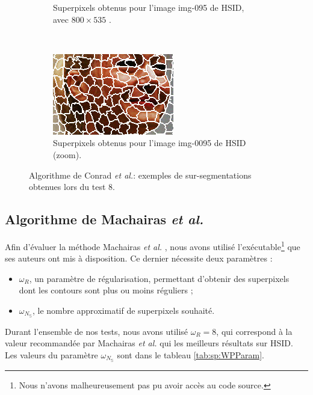 \begin{figure}[htb]
\begin{subfigure}[t]{0.45\textwidth}
		 	\caption{Superpixels obtenus pour l'image img-095 de HSID, avec $ 800 \times 535$ .}
	\end{subfigure}
	~
	 \begin{subfigure}[t]{0.45\textwidth}	
			\includegraphics[width=\textwidth]{images/sur-segmentation/CRS/EX2-img-095-ext1}
		 	\caption{Superpixels obtenus pour l'image img-0095 de HSID (zoom). }
	\end{subfigure}
	\caption{Algorithme de Conrad \textit{et al.}: exemples de sur-segmentations obtenues lors du test 8.}
	\label{fig:sp:excrs1}
\end{figure}

 \subsection{Algorithme de Machairas \textit{et al.}}
 Afin d'évaluer la méthode Machairas \textit{et al.} \cite{machairas2015waterpixels}, nous avons utilisé l'exécutable\footnote{Nous n'avons malheureusement pas pu avoir accès au code source.} que ses auteurs ont mis à disposition. Ce dernier nécessite deux paramètres :
 \begin{itemize}
 \item $\omega_{R}$, un paramètre de régularisation, permettant d'obtenir des superpixels dont les contours sont plus ou moins réguliers ;
 \item $\omega_{N_{\mathbb{S}}}$, le nombre approximatif de superpixels souhaité.
 \end{itemize}
 
 Durant l'ensemble de nos tests, nous avons utilisé $\omega_{R}=8$, qui correspond à la valeur recommandée par Machairas \textit{et al.}  qui  les meilleurs résultats sur HSID. Les valeurs du paramètre $\omega_{N_{\mathbb{S}}}$ sont  dans le tableau \ref{tab:sp:WPParam}.
 
